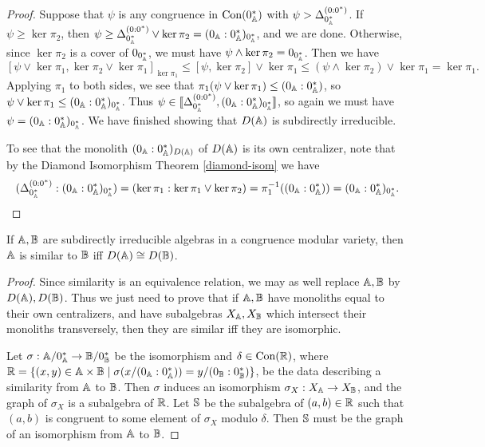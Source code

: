 \documentclass[letterpaper,11pt]{article}
\DeclareMathOperator{\Con}{Con}
\begin{document}
\begin{proof}
Suppose that $\psi$ is any congruence in $\Con(0_\bA^*)$ with $\psi > \Delta_{0_{\mathbb{A}}^*}^{(0:0^*)}$. If $\psi \ge \ker \pi_2$, then $\psi \ge \Delta_{0_{\mathbb{A}}^*}^{(0:0^*)} \vee \ker \pi_2 = (0_{\mathbb{A}} : 0_{\mathbb{A}}^*)_{0_{\mathbb{A}}^*}$, and we are done. Otherwise, since $\ker \pi_2$ is a cover of $0_{0_{\mathbb{A}}^*}$, we must have $\psi \wedge \ker \pi_2 = 0_{0_{\mathbb{A}}^*}$. Then we have
\[
[\psi \vee \ker \pi_1, \ker \pi_2 \vee \ker \pi_1]_{\ker \pi_1} \le [\psi, \ker \pi_2] \vee \ker \pi_1 \le (\psi \wedge \ker \pi_2) \vee \ker \pi_1 = \ker \pi_1.
\]
Applying $\pi_1$ to both sides, we see that $\pi_1(\psi \vee \ker \pi_1) \le (0_{\mathbb{A}} : 0_{\mathbb{A}}^*)$, so $\psi \vee \ker \pi_1 \le (0_{\mathbb{A}} : 0_{\mathbb{A}}^*)_{0_{\mathbb{A}}^*}$. Thus $\psi \in \llbracket \Delta_{0_{\mathbb{A}}^*}^{(0:0^*)}, (0_{\mathbb{A}} : 0_{\mathbb{A}}^*)_{0_{\mathbb{A}}^*}\rrbracket$, so again we must have $\psi = (0_{\mathbb{A}} : 0_{\mathbb{A}}^*)_{0_{\mathbb{A}}^*}$. We have finished showing that $D(\mathbb{A})$ is subdirectly irreducible.

To see that the monolith $(0_{\mathbb{A}}:0_{\mathbb{A}}^*)_{D(\mathbb{A})}$ of $D(\mathbb{A})$ is its own centralizer, note that by the Diamond Isomorphism Theorem \ref{diamond-isom} we have
\[
(\Delta_{0_{\mathbb{A}}^*}^{(0:0^*)} : (0_{\mathbb{A}} : 0_{\mathbb{A}}^*)_{0_{\mathbb{A}}^*}) = (\ker \pi_1 : \ker \pi_1 \vee \ker \pi_2) = \pi_1^{-1}((0_{\mathbb{A}} : 0_{\mathbb{A}}^*)) = (0_{\mathbb{A}} : 0_{\mathbb{A}}^*)_{0_{\mathbb{A}}^*}.\qedhere
\]
\end{proof}

\begin{prop} If $\mathbb{A}, \mathbb{B}$ are subdirectly irreducible algebras in a congruence modular variety, then $\mathbb{A}$ is similar to $\mathbb{B}$ iff $D(\mathbb{A}) \cong D(\mathbb{B})$.
\end{prop}
\begin{proof} Since similarity is an equivalence relation, we may as well replace $\mathbb{A}, \mathbb{B}$ by $D(\mathbb{A}), D(\mathbb{B})$. Thus we just need to prove that if $\mathbb{A}, \mathbb{B}$ have monoliths equal to their own centralizers, and have subalgebras $X_{\mathbb{A}}, X_{\mathbb{B}}$ which intersect their monoliths transversely, then they are similar iff they are isomorphic.

Let $\sigma : \mathbb{A}/0_{\mathbb{A}}^* \rightarrow \mathbb{B}/0_{\mathbb{B}}^*$ be the isomorphism and $\delta \in \Con(\RR)$, where $\mathbb{R} = \{(x,y) \in \mathbb{A} \times \mathbb{B} \mid \sigma(x/(0_{\mathbb{A}}:0_{\mathbb{A}}^*)) = y/(0_{\mathbb{B}}:0_{\mathbb{B}}^*)\}$, be the data describing a similarity from $\mathbb{A}$ to $\mathbb{B}$. Then $\sigma$ induces an isomorphism $\sigma_X : X_{\mathbb{A}} \rightarrow X_{\mathbb{B}}$, and the graph of $\sigma_X$ is a subalgebra of $\mathbb{R}$. Let $\mathbb{S}$ be the subalgebra of $(a,b) \in \mathbb{R}$ such that $(a,b)$ is congruent to some element of $\sigma_X$ modulo $\delta$. Then $\mathbb{S}$ must be the graph of an isomorphism from $\mathbb{A}$ to $\mathbb{B}$.
\end{proof}
\end{document}
